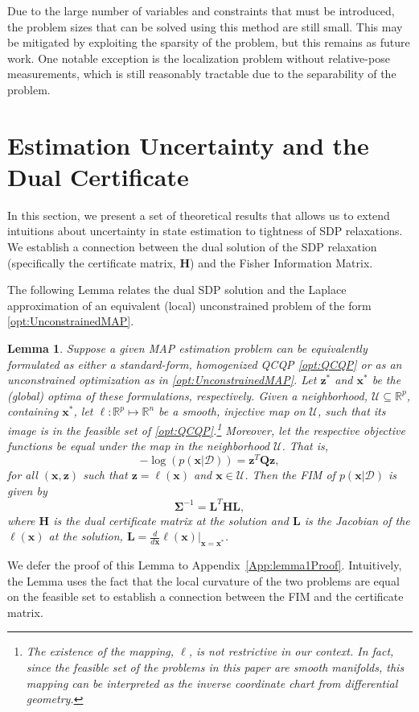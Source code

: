 \documentclass[lettersize,journal]{IEEEtran}
\newtheorem{lemma}[theorem]{Lemma}
\begin{document}
Due to the large number of variables and constraints that must be introduced, the problem sizes that can be solved using this method are still small. This may be mitigated by exploiting the sparsity of the problem, but this remains as future work. One notable exception is the localization problem without relative-pose measurements, which is still reasonably tractable due to the separability of the problem. 


\section{Estimation Uncertainty and the Dual Certificate}\label{sec:Uncertainty}

In this section, we present a set of theoretical results that allows us to extend intuitions about uncertainty in state estimation to tightness of SDP relaxations. We establish a connection between the dual solution of the SDP relaxation (specifically the certificate matrix, $\bm{H}$) and the Fisher Information Matrix. 

The following Lemma relates the dual SDP solution and the Laplace approximation of an equivalent (local) unconstrained problem of the form \eqref{opt:UnconstrainedMAP}. 

\begin{lemma}\label{lem:FisherInfo}
	Suppose a given MAP estimation problem can be equivalently formulated as either a standard-form, homogenized QCQP \eqref{opt:QCQP} or as an unconstrained optimization as in \eqref{opt:UnconstrainedMAP}. Let $\bm{z}^*$ and $\bm{x}^*$ be the (global) optima of these formulations, respectively. Given a neighborhood, $\mathcal{U} \subseteq \mathbb{R}^p$, containing $\bm{x}^*$, let $\bm{\ell}: \mathbb{R}^p \mapsto \mathbb{R}^n$ be a \emph{smooth, injective} map on $\mathcal{U}$, such that its image is in the feasible set of \eqref{opt:QCQP}.\footnote{The existence of the mapping, $\bm{\ell}$, is not restrictive in our context. In fact, since the feasible set of the problems in this paper are smooth manifolds, this mapping can be interpreted as the \emph{inverse coordinate chart} from differential geometry.} Moreover, let the respective objective functions be equal under the map in the neighborhood $\mathcal{U}$. That is,
	\begin{equation}
		-\log\left(p(\bm{x} \vert \bm{\mathcal{D}})\right) = \bm{z}^T \bm{Q} \bm{z},
	\end{equation}
	for all $(\bm{x}, \bm{z})$ such that $\bm{z}=\bm{\ell}(\bm{x})$ and $\bm{x} \in \mathcal{U}$. Then the FIM of $p(\bm{x} \vert \bm{\mathcal{D}})$ is given by
	\begin{equation}\label{eqn:FIM_H}
		\bm{\Sigma}^{-1}= \bm{L}^T \bm{H}\bm{L},
	\end{equation}
	where $\bm{H}$ is the dual certificate matrix at the solution and $\bm{L}$ is the Jacobian of the $\bm{\ell}(\bm{x})$ at the solution, $\bm{L} = \frac{d}{d\bm{x}}\bm{\ell}(\bm{x})\vert_{\bm{x}=\bm{x}^*}$. 
\end{lemma}
We defer the proof of this Lemma to Appendix~\ref{App:lemma1Proof}. Intuitively, the Lemma uses the fact that the local curvature of the two problems are equal on the feasible set to establish a connection between the FIM and the certificate matrix. 
\end{document}
